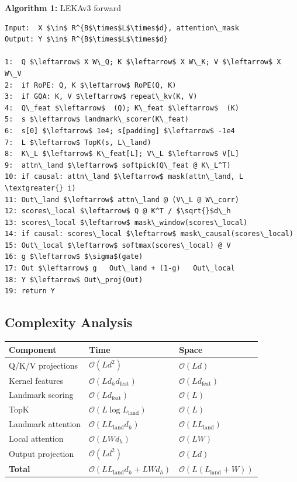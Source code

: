 \textbf{Algorithm 1:} LEKAv3 forward
\begin{lstlisting}
Input:  X $\in$ R^{B$\times$L$\times$d}, attention\_mask
Output: Y $\in$ R^{B$\times$L$\times$d}

1:  Q $\leftarrow$ X W\_Q; K $\leftarrow$ X W\_K; V $\leftarrow$ X W\_V
2:  if RoPE: Q, K $\leftarrow$ RoPE(Q, K)
3:  if GQA: K, V $\leftarrow$ repeat\_kv(K, V)
4:  Q\_feat $\leftarrow$  (Q); K\_feat $\leftarrow$  (K)
5:  s $\leftarrow$ landmark\_scorer(K\_feat)
6:  s[0] $\leftarrow$ 1e4; s[padding] $\leftarrow$ -1e4
7:  L $\leftarrow$ TopK(s, L\_land)
8:  K\_L $\leftarrow$ K\_feat[L]; V\_L $\leftarrow$ V[L]
9:  attn\_land $\leftarrow$ softpick(Q\_feat @ K\_L^T)
10: if causal: attn\_land $\leftarrow$ mask(attn\_land, L \textgreater{} i)
11: Out\_land $\leftarrow$ attn\_land @ (V\_L @ W\_corr)
12: scores\_local $\leftarrow$ Q @ K^T / $\sqrt{}$d\_h
13: scores\_local $\leftarrow$ mask\_window(scores\_local)
14: if causal: scores\_local $\leftarrow$ mask\_causal(scores\_local)
15: Out\_local $\leftarrow$ softmax(scores\_local) @ V
16: g $\leftarrow$ $\sigma$(gate)
17: Out $\leftarrow$ g   Out\_land + (1-g)   Out\_local
18: Y $\leftarrow$ Out\_proj(Out)
19: return Y
\end{lstlisting}

\subsection{Complexity Analysis}

\begin{table}[H]
\centering
\small
\begin{tabular}{lll}
\toprule
\textbf{Component} & \textbf{Time} & \textbf{Space} \\
\midrule
Q/K/V projections & $\mathcal{O}(L d^2)$ & $\mathcal{O}(L d)$ \\
Kernel features & $\mathcal{O}(L d_h d_\text{feat})$ & $\mathcal{O}(L d_\text{feat})$ \\
Landmark scoring & $\mathcal{O}(L d_\text{feat})$ & $\mathcal{O}(L)$ \\
TopK & $\mathcal{O}(L \log L_\text{land})$ & $\mathcal{O}(L)$ \\
Landmark attention & $\mathcal{O}(L L_\text{land} d_h)$ & $\mathcal{O}(L L_\text{land})$ \\
Local attention & $\mathcal{O}(L W d_h)$ & $\mathcal{O}(L W)$ \\
Output projection & $\mathcal{O}(L d^2)$ & $\mathcal{O}(L d)$ \\
\textbf{Total} & $\mathcal{O}(L L_\text{land} d_h + L W d_h)$ & $\mathcal{O}(L(L_\text{land} + W))$ \\
\bottomrule
\end{tabular}
\end{table}

